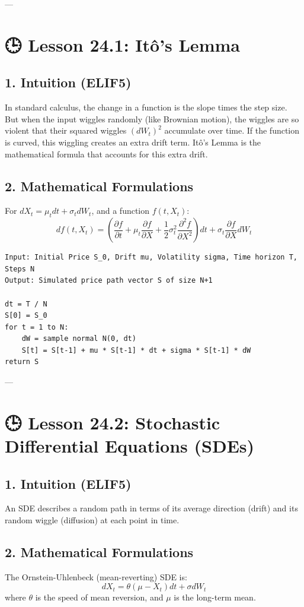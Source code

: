 \documentclass[11pt,oneside]{book}
\begin{document}
---

\section{🕒 Lesson 24.1: Itô's Lemma}

\subsection{1. Intuition (ELIF5)}
In standard calculus, the change in a function is the slope times the step size. But when the input wiggles randomly (like Brownian motion), the wiggles are so violent that their squared wiggles $(dW_t)^2$ accumulate over time. If the function is curved, this wiggling creates an extra drift term. Itô's Lemma is the mathematical formula that accounts for this extra drift.

\subsection{2. Mathematical Formulations}
For $dX_t = \mu_t dt + \sigma_t dW_t$, and a function $f(t, X_t)$:
$$df(t, X_t) = \left( \frac{\partial f}{\partial t} + \mu_t \frac{\partial f}{\partial X} + \frac{1}{2} \sigma_t^2 \frac{\partial^2 f}{\partial X^2} \right) dt + \sigma_t \frac{\partial f}{\partial X} dW_t$$

\begin{tcolorbox}[colback=white,colframe=black,boxrule=0.6pt,arc=0mm,title=Euler-Maruyama GBM Simulation]
\begin{verbatim}
Input: Initial Price S_0, Drift mu, Volatility sigma, Time horizon T, Steps N
Output: Simulated price path vector S of size N+1

dt = T / N
S[0] = S_0
for t = 1 to N:
    dW = sample normal N(0, dt)
    S[t] = S[t-1] + mu * S[t-1] * dt + sigma * S[t-1] * dW
return S
\end{verbatim}
\end{tcolorbox}

---

\section{🕒 Lesson 24.2: Stochastic Differential Equations (SDEs)}

\subsection{1. Intuition (ELIF5)}
An SDE describes a random path in terms of its average direction (drift) and its random wiggle (diffusion) at each point in time.

\subsection{2. Mathematical Formulations}
The Ornstein-Uhlenbeck (mean-reverting) SDE is:
$$dX_t = \theta(\mu - X_t) dt + \sigma dW_t$$
where $\theta$ is the speed of mean reversion, and $\mu$ is the long-term mean.


\newpage
\end{document}
